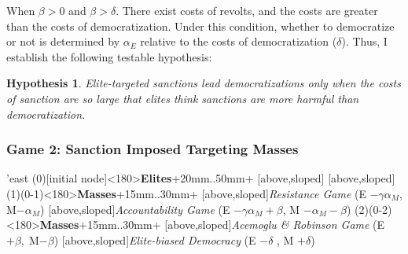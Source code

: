 \documentclass[11pt, letterpage]{article}
\newtheorem{hyp}{Hypothesis}
\begin{document}
	
When $\beta > 0$ and $\beta > \delta$. There exist costs of revolts, and the costs are greater than the costs of democratization. Under this condition, whether to democratize or not is determined by $\alpha_{E}$ relative to the costs of democratization ($\delta$). Thus, I establish the following testable hypothesis:
	
\begin{hyp}
	\label{hyp1}
	Elite-targeted sanctions lead democratizations only when the costs of sanction are so large that elites think sanctions are more harmful than democratization.
\end{hyp}


	
\subsubsection*{Game 2: Sanction Imposed Targeting Masses}
\begin{center}
\begin{istgame}[font=\footnotesize]
	\centering
	\setistgrowdirection'{east}
	\xtShowArrows
	\istroot(0)[initial node]<180>{\textbf{Elites}}+20mm..50mm+
	[above,sloped]  [above,sloped] \endist
	\istroot(1)(0-1)<180>{\textbf{Masses}}+15mm..30mm+
	[above,sloped]{\textit{Resistance Game} (E $- \gamma\alpha_{M}$, M$-\alpha_{M}$) }
	[above,sloped]{\textit{Accountability Game} (E $- \gamma\alpha_{M} + \beta$, M $- \alpha_{M} - \beta$)}  \endist
	\istroot(2)(0-2)<180>{\textbf{Masses}}+15mm..30mm+
	[above,sloped]{\textit{Acemoglu \& Robinson Game} (E $+ \beta,\; $M$-\beta$)}
	[above,sloped]{\textit{Elite-biased Democracy} (E $-\delta$ , M $+ \delta$)} \endist
\end{istgame}
\end{center}
\end{document}
